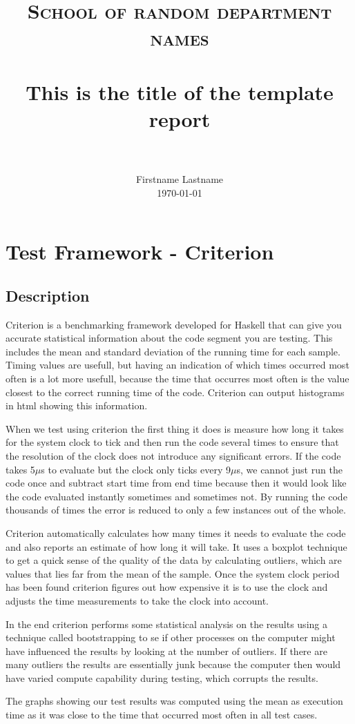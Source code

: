 \documentclass[paper=a4, fontsize=11pt]{scrartcl}
\title{
		\usefont{OT1}{bch}{b}{n}
		\normalfont \normalsize \textsc{School of random department names} \\ [25pt]
		\horrule{0.5pt} \\[0.4cm]
		\huge This is the title of the template report \\
		\horrule{2pt} \\[0.5cm]
}
\author{
		\normalfont 								\normalsize
        Firstname Lastname\\[-3pt]		\normalsize
        \today
}
\date{}
\numberwithin{equation}{section}		%
\numberwithin{figure}{section}			%
\numberwithin{table}{section}				%
\begin{document}
\section{Test Framework - Criterion}
\subsection{Description}
	Criterion is a benchmarking framework developed for Haskell that can give you accurate statistical information about the code segment you are testing. This includes the mean and standard deviation of the running time for each sample. Timing values are usefull, but having an indication of which times occurred most often is a lot more usefull, because the time that occurres most often is the value closest to the correct running time of the code. Criterion can output histograms in html showing this information. 

When we test using criterion the first thing it does is measure how long it takes for the system clock to tick and then run the code several times to ensure that the resolution of the clock does not introduce any significant errors. If the code takes 5$\mu$s to evaluate but the clock only ticks every 9$\mu$s, we cannot just run the code once and subtract start time from end time because then it would look like the code evaluated instantly sometimes and sometimes not. By running the code thousands of times the error is reduced to only a few instances out of the whole. 

Criterion automatically calculates how many times it needs to evaluate the code and also reports an estimate of how long it will take. It uses a boxplot technique to get a quick sense of the quality of the data by calculating outliers, which are values that lies far from the mean of the sample. Once the system clock period has been found criterion figures out how expensive it is to use the clock and adjusts the time measurements to take the clock into account. 

In the end criterion performs some statistical analysis on the results using a technique called bootstrapping to se if other processes on the computer might have influenced the results by looking at the number of outliers. If there are many outliers the results are essentially junk because the computer then would have varied compute capability during testing, which corrupts the results.  

The graphs showing our test results was computed using the mean as execution time as it was close to the time that occurred most often in all test cases.
\end{document}
